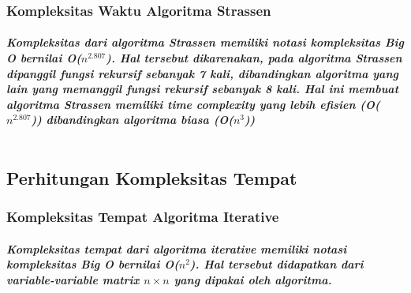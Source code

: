 \documentclass[conference]{IEEEtran}
\begin{document}
\subsubsection{Kompleksitas Waktu Algoritma Strassen}
\paragraph*{
    \emph{Kompleksitas dari algoritma Strassen memiliki notasi kompleksitas Big O bernilai O($n^{2.807}$). 
    Hal tersebut dikarenakan, pada algoritma Strassen dipanggil fungsi rekursif sebanyak 7 kali, dibandingkan
    algoritma yang lain yang memanggil fungsi rekursif sebanyak 8 kali. Hal ini membuat algoritma Strassen
    memiliki time complexity yang lebih efisien (O($n^{2.807}$)) dibandingkan algoritma biasa (O($n^{3}$))\\\\}
}

\subsection{Perhitungan Kompleksitas Tempat}

\subsubsection{Kompleksitas Tempat Algoritma Iterative}
\paragraph*{
    \emph{Kompleksitas tempat dari algoritma iterative memiliki notasi kompleksitas Big O bernilai O($n^{2}$). 
    Hal tersebut didapatkan dari variable-variable matrix $n \times n$ yang dipakai oleh algoritma.\\\\}
}

\end{document}

